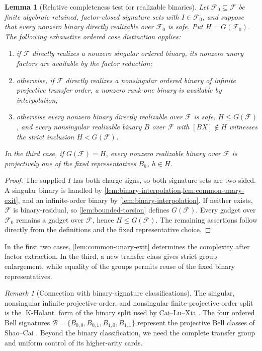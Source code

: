 \documentclass[11pt,letterpaper,onecolumn]{article}
\theoremstyle{plain}
\newtheorem{lemma}[lemma]{Lemma}
\theoremstyle{definition}
\theoremstyle{remark}
\newtheorem{remark}[remark]{Remark}
\newcommand{\cF}{\mathcal F}
\newcommand{\KHolant}{\operatorname{K\text{-}Holant}}
\begin{document}
\begin{lemma}[Relative completeness test for realizable binaries]
\label{lem:actual-binary-completeness}
Let \(\cF_0\subseteq\cF\) be finite algebraic retained,
factor-closed signature sets with \(I\in\cF_0\), and suppose that
every nonzero binary directly realizable over \(\cF_0\) is safe.  Put
\(H=G(\cF_0)\).  The following exhaustive ordered case distinction applies:
\begin{enumerate}
\item if \(\cF\) directly realizes a nonzero singular ordered binary,
      its nonzero unary factors are available by the factor reduction;
\item otherwise, if \(\cF\) directly realizes a nonsingular ordered
      binary of infinite projective transfer order, a nonzero rank-one
      binary is available by interpolation;
\item otherwise every nonzero binary directly realizable over \(\cF\) is safe, \(H\le G(\cF)\), and
      every nonsingular realizable binary \(B\) over \(\cF\) with
      \([BX]\notin H\) witnesses the strict inclusion \(H<G(\cF)\).
\end{enumerate}
In the third case, if \(G(\cF)=H\), every nonzero realizable binary over
\(\cF\) is projectively one of the fixed representatives \(B_h\),
\(h\in H\).
\end{lemma}

\begin{proof}
The supplied \(I\) has both charge signs, so both signature sets are two-sided.
A singular binary is handled by
\cref{lem:binary-interpolation,lem:common-unary-exit}, and an infinite-order
binary by \cref{lem:binary-interpolation}.  If neither exists, \(\cF\)
is binary-residual, so \cref{lem:bounded-torsion} defines \(G(\cF)\).
Every gadget over \(\cF_0\) remains a gadget over \(\cF\), hence
\(H\le G(\cF)\).  The remaining assertions follow directly from the
definitions and the fixed representative choice.
\end{proof}

In the first two cases, \cref{lem:common-unary-exit} determines the
complexity after factor extraction. In the third, a new transfer class
gives strict group enlargement, while equality of the groups permits
reuse of the fixed binary representatives.

\begin{remark}[Connection with binary-signature classifications]
The singular, nonsingular infinite-projective-order, and nonsingular
finite-projective-order split is the \(\KHolant\) form of the binary split
used by Cai--Lu--Xia \cite{CaiLuXia2009,CaiLuXia2018RealHolantc}.  The four
ordered Bell signatures
\(\mathcal B=\{B_{0,0},B_{0,1},B_{1,0},B_{1,1}\}\) represent the projective
Bell classes of Shao--Cai \cite{ShaoCai2020}. Beyond the binary classification, we need the
complete transfer group and uniform control of its higher-arity cards.
\end{remark}
\end{document}
